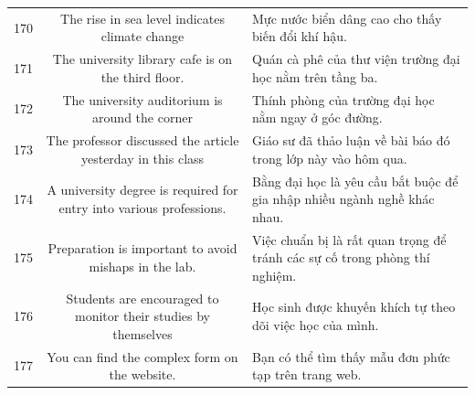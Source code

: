\documentclass[11pt,a4paper]{article}
\begin{document}
\begin{longtable}{N S M}
170 & The rise in sea level indicates climate change & Mực nước biển dâng cao cho thấy biến đổi khí hậu. \\
171 & The university library cafe is on the third floor. & Quán cà phê của thư viện trường đại học nằm trên tầng ba. \\
172 & The university auditorium is around the corner & Thính phòng của trường đại học nằm ngay ở góc đường. \\
173 & The professor discussed the article yesterday in this class & Giáo sư đã thảo luận về bài báo đó trong lớp này vào hôm qua. \\
174 & A university degree is required for entry into various professions. & Bằng đại học là yêu cầu bắt buộc để gia nhập nhiều ngành nghề khác nhau. \\
175 & Preparation is important to avoid mishaps in the lab. & Việc chuẩn bị là rất quan trọng để tránh các sự cố trong phòng thí nghiệm. \\
176 & Students are encouraged to monitor their studies by themselves & Học sinh được khuyến khích tự theo dõi việc học của mình. \\
177 & You can find the complex form on the website. & Bạn có thể tìm thấy mẫu đơn phức tạp trên trang web. \\
\end{longtable}
\end{document}

